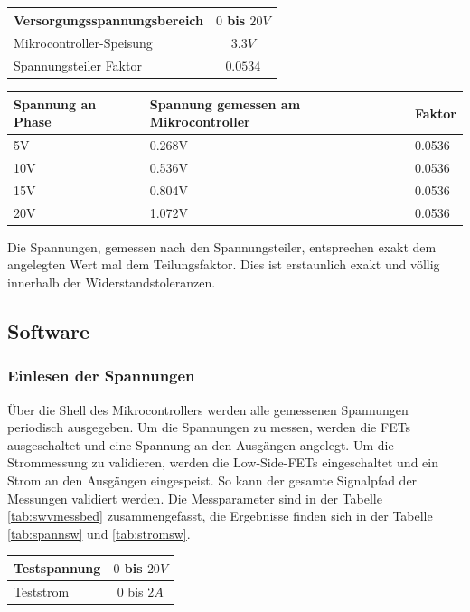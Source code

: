\begin{center}
	\begin{tabular}{l|c}
		\hline 
		Versorgungsspannungsbereich & $0$ bis $20V$ \\ \hline
		Mikrocontroller-Speisung & $3.3V$ \\ \hline
		Spannungsteiler Faktor & $0.0534$ \\ \hline
	\end{tabular} 
	\label{tab:vmessbed}
\end{center}

\begin{center}
	\begin{tabular}{l|l|l}
		Spannung an Phase & Spannung gemessen am Mikrocontroller & Faktor\\ \hline
		5V & 0.268V & 0.0536\\ \hline
		10V & 0.536V & 0.0536\\ \hline
		15V & 0.804V & 0.0536\\ \hline
		20V & 1.072V & 0.0536\\ \hline
	\end{tabular} 
	\label{tab:spannteiler}
\end{center}

Die Spannungen, gemessen nach den Spannungsteiler, entsprechen exakt dem angelegten Wert mal dem Teilungsfaktor. Dies ist erstaunlich exakt und völlig innerhalb der Widerstandstoleranzen.

\subsection{Software}
\subsubsection*{Einlesen der Spannungen}
Über die Shell des Mikrocontrollers werden alle gemessenen Spannungen periodisch ausgegeben. Um die Spannungen zu messen, werden die FETs ausgeschaltet und eine Spannung an den Ausgängen angelegt. Um die Strommessung zu validieren, werden die Low-Side-FETs eingeschaltet und ein Strom an den Ausgängen eingespeist. So kann der gesamte Signalpfad der Messungen validiert werden. Die Messparameter sind in der Tabelle \ref{tab:swvmessbed} zusammengefasst, die Ergebnisse finden sich in der Tabelle \ref{tab:spannsw} und \ref{tab:stromsw}.

\begin{center}
	\begin{tabular}{l|c}
		\hline 
		Testspannung & $0$ bis $20V$ \\ \hline
		Teststrom & $0$ bis $2A$ \\ \hline
	\end{tabular} 
	\label{tab:swvmessbed}
\end{center}

